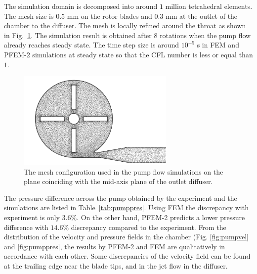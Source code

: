The simulation domain is decomposed into around $1$ million tetrahedral elements. The mesh size is $0.5$ mm on the rotor blades and $0.3$ mm at the outlet of the chamber to the diffuser. The mesh is locally refined around the throat as shown in Fig.~\ref{fig:pumpmesh}. The simulation result is obtained after $8$ rotations when the pump flow already reaches steady state. The time step size is around $10^{-5}$ s in FEM and PFEM-2 simulations at steady state so that the CFL number is less or equal than $1$.  
\begin{figure}[htbp]
    \centering
    \includegraphics[width=3in]{imgs/nozzle_pump/pump_mesh_2.pdf}
    \caption{The mesh configuration used in the pump flow simulations on the plane coinciding with the mid-axis plane of the outlet diffuser.}
    \label{fig:pumpmesh}
\end{figure}

The pressure difference across the pump obtained by the experiment and the simulations are listed in Table~\ref{tab:pumppres}. Using FEM the discrepancy with experiment is only $3.6$\%. On the other hand, PFEM-2 predicts a lower pressure difference with $14.6$\% discrepancy compared to the experiment. From the distribution of the velocity and pressure fields in the chamber (Fig. \ref{fig:pumpvel} and \ref{fig:pumppres}, the results by PFEM-2 and FEM are qualitatively in accordance with each other. Some discrepancies of the velocity field can be found at the trailing edge near the blade tips, and in the jet flow in the diffuser. 


